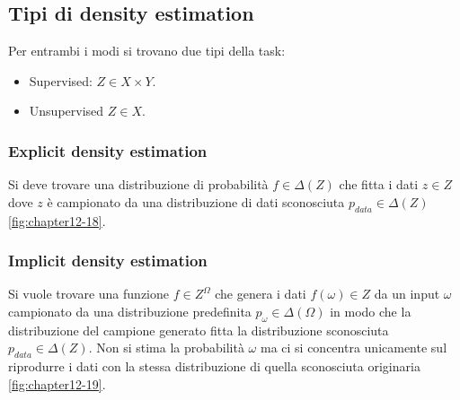 	\subsection{Tipi di density estimation}
	Per entrambi i modi si trovano due tipi della task:
	\begin{itemize}
		\item Supervised: $Z\in X\times Y$.
		\item Unsupervised $Z\in X$.
	\end{itemize}

		\subsubsection{Explicit density estimation}
		Si deve trovare una distribuzione di probabilit\`a $f\in \Delta(Z)$ che fitta i dati $z\in Z$ dove $z$ \`e campionato da una distribuzione di dati sconosciuta $p_{data}\in\Delta(Z)$ \ref{fig:chapter12-18}.
		
		\subsubsection{Implicit density estimation}
		Si vuole trovare una funzione $f\in Z^\Omega$ che genera i dati $f(\omega)\in Z$ da un input $\omega$ campionato da una distribuzione predefinita $p_\omega\in\Delta(\Omega)$ in modo che la distribuzione del campione generato fitta la distribuzione sconosciuta $p_{data}\in\Delta(Z)$.
		Non si stima la probabilit\`a $\omega$ ma ci si concentra unicamente sul riprodurre i dati con la stessa distribuzione di quella sconosciuta originaria \ref{fig:chapter12-19}.
		

